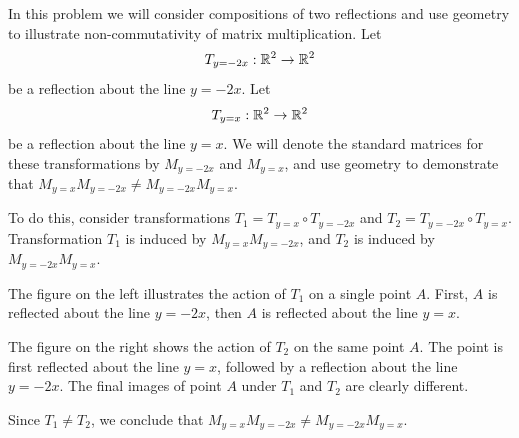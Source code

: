 \documentclass{ximera}
\begin{document}
\begin{example}\label{init:reflectioncomp}  In this problem we will consider compositions of two reflections and use geometry to illustrate non-commutativity of matrix multiplication.  
Let $$T_{y=-2x}:\mathbb{R}^2\rightarrow \mathbb{R}^2$$ be a reflection about the line $y=-2x$.  Let $$T_{y=x}:\mathbb{R}^2\rightarrow \mathbb{R}^2$$ be a reflection about the line $y=x$. We will denote the standard matrices for these transformations by $M_{y=-2x}$ and $M_{y=x}$, and
use geometry to demonstrate that $M_{y=x}M_{y=-2x}\neq M_{y=-2x}M_{y=x}$.  
 
 To do this, consider transformations $T_1=T_{y=x}\circ T_{y=-2x}$ and $T_2=T_{y=-2x}\circ T_{y=x}$.  Transformation $T_1$ is induced by $M_{y=x}M_{y=-2x}$, and $T_2$ is induced by $M_{y=-2x}M_{y=x}$.

The figure on the left illustrates the action of $T_1$ on a single point $A$.  First, $A$ is reflected about the line $y=-2x$, then $A$ is reflected about the line $y=x$.   

The figure on the right shows the action of $T_2$ on the same point $A$.  The point is first reflected about the line $y=x$, followed by a reflection about the line $y=-2x$.  The final images of point $A$ under $T_1$ and $T_2$ are clearly different.

\begin{center}
  \quad\quad
{}
\end{center}

Since $T_1\neq T_2$, we conclude that $M_{y=x}M_{y=-2x}\neq M_{y=-2x}M_{y=x}$.

\end{example}
\end{document}
